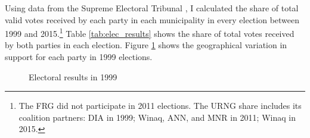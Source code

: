 \documentclass[12pt, notitlepage]{article}
\begin{document}
Using data from the Supreme Electoral Tribunal \citep{TSE:2019aa}, I calculated the share of total valid votes received by each party in each municipality in every election between 1999 and 2015.\footnote{The FRG did not participate in 2011 elections. The URNG share includes its coalition partners: DIA in 1999; Winaq, ANN, and MNR in 2011; Winaq in 2015.}
Table \ref{tab:elec_results} shows the share of total votes received by both parties in each election.
Figure \ref{fig:map_elec1999} shows the geographical variation in support for each party in 1999 elections.

\begin{figure}[!ht]
    \centering

    \begin{minipage}{1\textwidth}
      \centering
      \hspace{25pt}
    \end{minipage}

    \caption{Electoral results in 1999}\label{fig:map_elec1999}

\end{figure}
\end{document}

